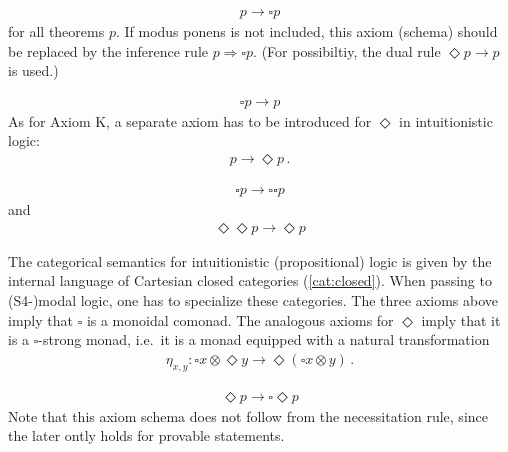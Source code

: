     \begin{axiom}[Necessitation]
        \begin{gather}
            p\rightarrow\square p
        \end{gather}
        for all theorems $p$. If modus ponens is not included, this axiom (schema) should be replaced by the inference rule $p\Rightarrow\square p$. (For possibiltiy, the dual rule $\Diamond p\rightarrow p$ is used.)
    \end{axiom}


    \begin{axiom}[T]
        \begin{gather}
            \square p\rightarrow p
        \end{gather}
        As for Axiom K, a separate axiom has to be introduced for $\Diamond$ in intuitionistic logic:
        \begin{gather}
            p\rightarrow\Diamond p\,.
        \end{gather}
    \end{axiom}

    \begin{axiom}[S4]
        \begin{gather}
            \square p\rightarrow\square\square p
        \end{gather}
        and
        \begin{gather}
            \Diamond\Diamond p\rightarrow\Diamond p
        \end{gather}
    \end{axiom}

    The categorical semantics for intuitionistic (propositional) logic is given by the internal language of Cartesian closed categories (\cref{cat:closed}). When passing to (S4-)modal logic, one has to specialize these categories. The three axioms above imply that $\square$ is a monoidal comonad. The analogous axioms for $\Diamond$ imply that it is a $\square$-strong monad, i.e.~it is a monad equipped with a natural transformation
    \begin{gather}
        \eta_{x,y}:\square x\otimes\Diamond y\rightarrow\Diamond(\square x\otimes y)\,.
    \end{gather}

    \begin{axiom}[S5]
        \begin{gather}
            \Diamond p\rightarrow\square\Diamond p
        \end{gather}
        Note that this axiom schema does not follow from the necessitation rule, since the later ontly holds for provable statements.
    \end{axiom}

